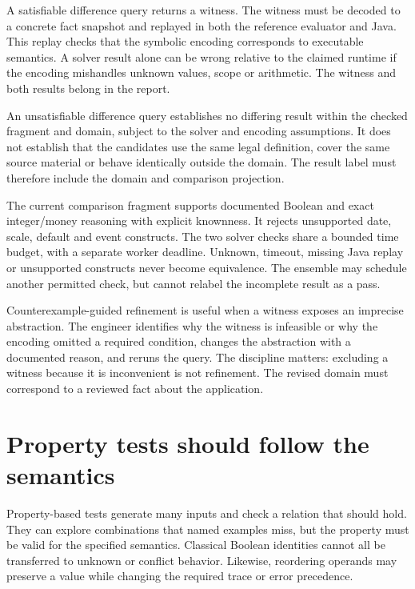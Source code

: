 \documentclass[12pt,a4paper,oneside,openany]{book}
\begin{document}
A satisfiable difference query returns a witness. The witness must be decoded to
a concrete fact snapshot and replayed in both the reference evaluator and Java.
This replay checks that the symbolic encoding corresponds to executable semantics.
A solver result alone can be wrong relative to the claimed runtime if the
encoding mishandles unknown values, scope or arithmetic. The witness and both
results belong in the report.

An unsatisfiable difference query establishes no differing result within the
checked fragment and domain, subject to the solver and encoding assumptions. It
does not establish that the candidates use the same legal definition, cover the
same source material or behave identically outside the domain. The result label
must therefore include the domain and comparison projection.

The current comparison fragment supports documented Boolean and exact
integer/money reasoning with explicit knownness. It rejects unsupported date,
scale, default and event constructs. The two solver checks share a bounded time
budget, with a separate worker deadline. Unknown, timeout, missing Java replay or
unsupported constructs never become equivalence. The ensemble may schedule
another permitted check, but cannot relabel the incomplete result as a pass.

Counterexample-guided refinement is useful when a witness exposes an imprecise
abstraction. The engineer identifies why the witness is infeasible or why the
encoding omitted a required condition, changes the abstraction with a documented
reason, and reruns the query. The discipline matters: excluding a witness because
it is inconvenient is not refinement. The revised domain must correspond to a
reviewed fact about the application.

\section{Property tests should follow the semantics}
\label{merge:M07:08}


Property-based tests generate many inputs and check a relation that should hold.
They can explore combinations that named examples miss, but the property must
be valid for the specified semantics. Classical Boolean identities cannot all be
transferred to unknown or conflict behavior. Likewise, reordering operands may
preserve a value while changing the required trace or error precedence.
\end{document}

